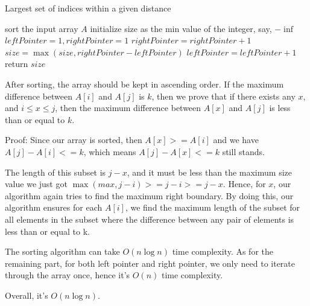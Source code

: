 
\begin{algorithm}
  \caption{Largest set of indices within a given distance}
  sort the input array $A$\;
  initialize size as the min value of the integer, say, $-\inf$\;
  $leftPointer = 1, rightPointer = 1$\;
  {
    {
    	$rightPointer = rightPointer + 1$\;
    }
    $size = \max(size, rightPointer-leftPointer)$\;
    $leftPointer = leftPointer +1$\;
}
    return $size$\;
\end{algorithm}


After sorting, the array should be kept in ascending order. If the maximum difference between $A[i]$ and $A[j]$ is $k$, then we prove that if there exists any $x$, and $i \leq x \leq j$, then the maximum difference between $A[x]$ and $A[j]$ is less than or equal to $k$.

Proof: Since our array is sorted, then $A[x]>=A[i]$ and we have $A[j]-A[i]<=k$, which means $A[j]-A[x]<=k$ still stands. 

The length of this subset is $j-x$, and it must be less than the maximum size value we just got $\max(max, j-i) >= j-i >= j-x$. Hence, for $x$, our algorithm again tries to find the maximum right boundary. By doing this, our algorithm ensures for each $A[i]$, we find the maximum length of the subset for all elements in the subset where the difference between any pair of elements is less than or equal to k.


The sorting algorithm can take $O(n\log n)$ time complexity. As for the remaining part, for both left pointer and right pointer, we only need to iterate through the array once, hence it's $O(n)$ time complexity.

Overall, it's $O(n\log n)$.



